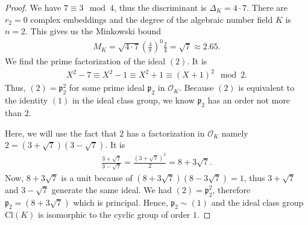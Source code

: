 \begin{proof}
    We have \(7 \equiv 3 \mod{4}\), thus the discriminant is \(\Delta_K = 4 \cdot 7\). There are \(r_2 = 0\) complex embeddings and the degree of the algebraic number field \(K\) is \(n = 2\). This gives us the Minkowski bound
    \begin{align*}
        M_K = \sqrt{4 \cdot 7} \left(\frac{4}{\pi}\right)^0 \frac{2}{4} = \sqrt{7} \approx 2.65 \text{.}
    \end{align*}
    We find the prime factorization of the ideal \((2)\). It is
    \begin{align*}
        X^2 - 7 \equiv X^2 - 1 \equiv X^2 + 1 \equiv (X + 1)^2 \mod{2} \text{.}
    \end{align*}
    Thus, \((2) = \mathfrak{p}_2^2\) for some prime ideal \(\mathfrak{p}_2\) in \(\mathcal{O}_K\). Because \((2)\) is equivalent to the identity \((1)\) in the ideal class group, we know \(\mathfrak{p}_2\) has an order not more than \(2\).

    Here, we will use the fact that \(2\) has a factorization in \(\mathcal{O}_K\) namely \(2 = (3 + \sqrt{7})(3 - \sqrt{7})\). It is
    \begin{align*}
        \frac{3 + \sqrt{7}}{3 - \sqrt{7}} = \frac{(3 + \sqrt{7})^2}{2} = 8 + 3 \sqrt{7} \text{.}
    \end{align*}
    Now, \(8 + 3 \sqrt{7}\) is a unit because of \((8 + 3 \sqrt{7}) (8 - 3 \sqrt{7}) = 1\), thus \(3 + \sqrt{7}\) and \(3 - \sqrt{7}\) generate the same ideal. We had \((2) = \mathfrak{p}_2^2\), therefore \(\mathfrak{p}_2 = (8 + 3 \sqrt{7})\) which is principal. Hence, \(\mathfrak{p}_2 \sim (1)\) and the ideal class group \(\mathrm{Cl}(K)\) is isomorphic to the cyclic group of order \(1\).
\end{proof}

